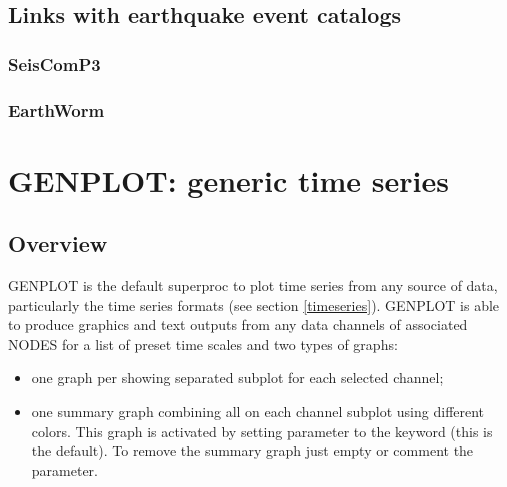 %






\subsection{Links with earthquake event catalogs}

\subsubsection{SeisComP3}

\subsubsection{EarthWorm}



\newpage
\section{GENPLOT: generic time series}
\label{genplot}

\subsection{Overview}

GENPLOT is the default superproc to plot time series from any source of data, particularly the time series formats (see section \ref{timeseries}). GENPLOT is able to produce graphics and text outputs from any data channels of associated NODES for a list of preset time scales and two types of graphs:
\begin{itemize}
\item one graph per  showing separated subplot for each selected channel;
\item one summary graph combining all  on each channel subplot using different colors. This graph is activated by setting  parameter to the keyword  (this is the default). To remove the summary graph just empty or comment the parameter.
\end{itemize}

